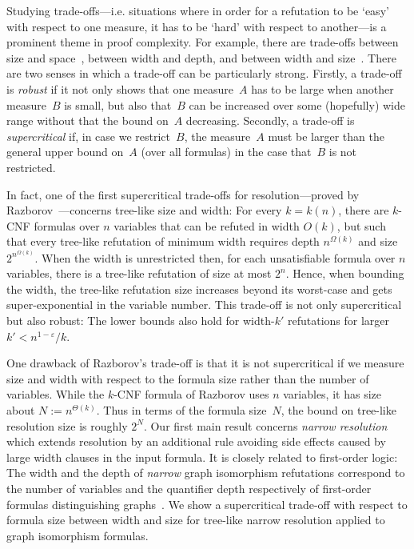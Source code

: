 \documentclass[10pt,a4paper]{article}
\begin{document}
Studying trade-offs---i.e.\! situations where in order for a refutation to be `easy' with respect to one measure, it has to be `hard' with respect to another---is a prominent theme in proof complexity. 
 For example, there are trade-offs between size and space~\cite{BeameBeckImpagliazzo2016,BenSassonNordstrom2011},
between width and depth, and between width and size~\cite{Berkholz2012, BerkholzNordstrom2020, Thapen2016}.
There are two senses in which a trade-off can be particularly strong. Firstly, a trade-off is \emph{robust}
if it not only shows that one measure~$A$ has to be large
when another measure~$B$ is small,
but also that~$B$ can be increased over some (hopefully) wide range
without that the bound on~$A$ decreasing.
Secondly, a trade-off is \emph{supercritical}
if, in case we restrict~$B$,
the measure~$A$ must be larger than the general upper bound on~$A$ (over all formulas) in the case that~$B$ is not restricted.

In fact,
one of
the first supercritical trade-offs for resolution---proved by Razborov~\cite{DBLP:journals/jacm/Razborov16}---concerns tree-like size and width:
For every $k=k(n)$,
there are $k$-CNF formulas over $n$ variables that can be refuted
in width $O(k)$, but such that every tree-like refutation of minimum width
requires depth $n^{\Omega(k)}$ and size
$2^{n^{\Omega(k)}}$.
When the width is unrestricted then, for each unsatisfiable formula over $n$ variables, there is a tree-like refutation of size at most $2^n$.
Hence, when bounding the width, the tree-like refutation size increases beyond its worst-case and gets super-exponential in the variable number.
This trade-off is not only supercritical but also robust:
The lower bounds also hold for
width-$k'$ refutations for larger $k' < n^{1-\varepsilon}/k$.

One drawback of Razborov's trade-off is that it is not supercritical if we measure size and width with respect to the formula size rather than the number of variables.
While the $k$-CNF formula of Razborov uses $n$ variables, it has size
about $N := n^{\Theta(k)}$.
Thus in terms of the formula size~$N$, the bound on tree-like resolution size is roughly $2^N$.
%
%
Our first main result concerns
\emph{narrow resolution}~\cite{DBLP:conf/sat/GalesiT05} which extends resolution by an additional rule
avoiding side effects caused by large width clauses in the input formula.
It is closely related to first-order logic: The  width
and the depth of
\emph{narrow} graph isomorphism refutations correspond to the number of variables and the quantifier depth respectively of first-order formulas distinguishing graphs~\cite{DBLP:conf/sat/ToranW23}.
%
%
%
%
%
%
%
%
%
%
%
%
We show a supercritical trade-off with respect to formula size between width and size for tree-like narrow resolution applied to graph isomorphism formulas. 
\end{document}

